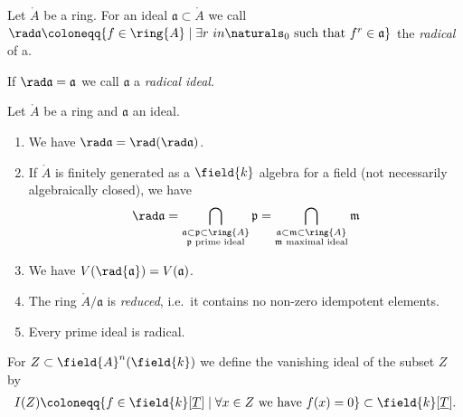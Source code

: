 \begin{definition}
  \label{def:radical-of-an-ideal}
  Let $\ring{A}$ be a ring. For an ideal $\mathfrak{a} \subset
  \ring{A}$ we call $\rad \mathfrak{a} \coloneqq \{f\in \ring{A} \mid
  \exists r\ in \naturals_0 \text{ such that } f^r \in \mathfrak{a}\}$
  the \textit{radical} of a.

  If $\rad\mathfrak{a} = \mathfrak{a}$ we call $\mathfrak{a}$ a
  \textit{radical ideal}.
\end{definition}

\begin{proposition}
  \label{prop:properties-of-the-radical}
  Let $\ring{A}$ be a ring and $\mathfrak{a}$ an ideal.
  \begin{enumerate}[label=(\roman*)]
  \item We have $\rad \mathfrak{a} = \rad (\rad \mathfrak{a})$.
  \item If $\ring{A}$ is finitely generated as a $\field{k}$ algebra
    for a field (not necessarily algebraically closed), we have
    \begin{align*}
      \rad \mathfrak{a}
      =
      \bigcap_{\substack{\mathfrak{a}\subset
      \mathfrak{p}\subset \ring{A}\\
      \mathfrak{p}\text{ prime ideal}}}
      \mathfrak{p}
      =
      \bigcap_{\substack{\mathfrak{a}\subset
      \mathfrak{m}\subset \ring{A}\\
      \mathfrak{m}\text{ maximal ideal}}}
      \mathfrak{m}
    \end{align*}
  \item We have $V(\rad{\mathfrak{a}})=V(\mathfrak{a})$.
  \item The ring $\ring{A}/\mathfrak{a}$ is \textit{reduced}, i.e.\ it
    contains no non-zero idempotent elements.
  \item Every prime ideal is radical.
  \end{enumerate}
\end{proposition}

\begin{definition}
  \label{def:vanishing-ideal}
  For $Z\subset \field{A}^n(\field{k})$ we define the vanishing ideal
  of the subset $Z$ by
  \begin{align*}
    I(Z) \coloneqq \{f\in \field{k}[\underline{T}]\mid \forall x\in Z
    \text{ we have } f(x) = 0\}\subset \field{k}[\underline{T}].
  \end{align*}  
\end{definition}

